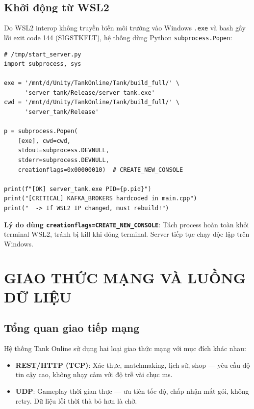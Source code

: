 \documentclass[12pt,a4paper]{report}
\begin{document}
\section{Khởi động từ WSL2}

Do WSL2 interop không truyền biến môi trường vào Windows \texttt{.exe} và bash gây lỗi exit code 144 (SIGSTKFLT), hệ thống dùng Python \texttt{subprocess.Popen}:

\begin{lstlisting}[style=bashStyle, caption={Script Python khởi động server\_tank.exe}, label={lst:startserver}]
# /tmp/start_server.py
import subprocess, sys

exe = '/mnt/d/Unity/TankOnline/Tank/build_full/' \
      'server_tank/Release/server_tank.exe'
cwd = '/mnt/d/Unity/TankOnline/Tank/build_full/' \
      'server_tank/Release'

p = subprocess.Popen(
    [exe], cwd=cwd,
    stdout=subprocess.DEVNULL,
    stderr=subprocess.DEVNULL,
    creationflags=0x00000010)  # CREATE_NEW_CONSOLE

print(f"[OK] server_tank.exe PID={p.pid}")
print("[CRITICAL] KAFKA_BROKERS hardcoded in main.cpp")
print("  -> If WSL2 IP changed, must rebuild!")
\end{lstlisting}

\textbf{Lý do dùng \texttt{creationflags=CREATE\_NEW\_CONSOLE}}: Tách process hoàn toàn khỏi terminal WSL2, tránh bị kill khi đóng terminal. Server tiếp tục chạy độc lập trên Windows.

\chapter{GIAO THỨC MẠNG VÀ LUỒNG DỮ LIỆU}

\section{Tổng quan giao tiếp mạng}

Hệ thống Tank Online sử dụng hai loại giao thức mạng với mục đích khác nhau:

\begin{itemize}
  \item \textbf{REST/HTTP (TCP)}: Xác thực, matchmaking, lịch sử, shop --- yêu cầu độ tin cậy cao, không nhạy cảm với độ trễ vài chục ms.
  \item \textbf{UDP}: Gameplay thời gian thực --- ưu tiên tốc độ, chấp nhận mất gói, không retry. Dữ liệu lỗi thời thà bỏ hơn là chờ.
\end{itemize}
\end{document}
